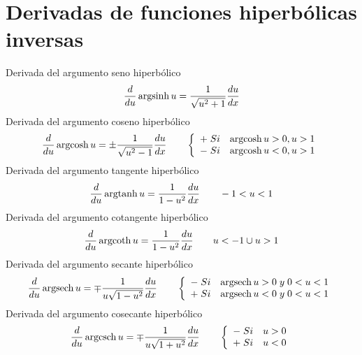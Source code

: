 \section{Derivadas de funciones hiperbólicas inversas}
Derivada del argumento seno hiperbólico 
\begin{equation}
	\frac{d}{du} \operatorname{argsinh} u = \frac{1}{\sqrt{u^2 + 1}}\frac{du}{dx}
\end{equation}
Derivada del argumento coseno hiperbólico
\begin{equation}
	\frac{d}{du} \operatorname{argcosh} u = \pm \frac{1}{\sqrt{u^2 - 1}}\frac{du}{dx}\qquad\left\{
	\begin{array}{ll}
		+\; Si  & \operatorname{argcosh} u > 0, u > 1  \\
		-\; Si  & \operatorname{argcosh} u < 0, u > 1
	\end{array}
	\right.
\end{equation}
Derivada del argumento tangente hiperbólico
\begin{equation}
	\frac{d}{du} \operatorname{argtanh} u = \frac{1}{1-u^2}\frac{du}{dx}\qquad -1 < u < 1
\end{equation}
Derivada del argumento cotangente hiperbólico
\begin{equation}
	\frac{d}{du} \operatorname{argcoth} u = \frac{1}{1-u^2}\frac{du}{dx}\qquad u < -1 \cup u > 1
\end{equation}
Derivada del  argumento secante hiperbólico
\begin{equation}
	\frac{d}{du} \operatorname{argsech} u = \mp \frac{1}{u\sqrt{1-u^2}}\frac{du}{dx}\qquad\left\{
	\begin{array}{ll}
		-\; Si  &  \operatorname{argsech} u  > 0\; y\; 0 < u < 1  \\
		+\; Si  &  \operatorname{argsech} u  < 0\; y\; 0 < u < 1
	\end{array}
	\right.
\end{equation}
Derivada del argumento cosecante hiperbólico
\begin{equation}
	\frac{d}{du} \operatorname{argcsch} u = \mp \frac{1}{u\sqrt{1+u^2}}\frac{du}{dx}\qquad\left\{
	\begin{array}{ll}
		-\; Si  & u>0  \\
		+\; Si  & u<0
	\end{array}
	\right.
\end{equation}